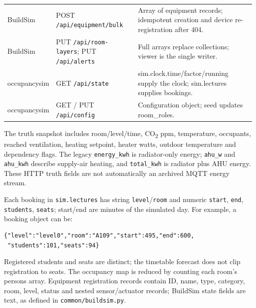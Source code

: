 \documentclass[11pt,a4paper]{article}
\begin{document}
{\begin{longtable}{p{27mm}p{63mm}p{54mm}}
BuildSim & POST \texttt{/api/equipment/bulk} & Array of equipment records; idempotent creation and device re-registration after 404.\\
BuildSim & PUT \texttt{/api/room-layers}; PUT \texttt{/api/alerts} & Full arrays replace collections; viewer is the single writer.\\
occupancysim & GET \texttt{/api/state} & sim.clock.time/factor/running supply the clock; sim.lectures supplies bookings.\\
occupancysim & GET / PUT \texttt{/api/config} & Configuration object; seed updates room\_roles.\\\bottomrule
\end{longtable}}
The truth snapshot includes room/level/time, CO\textsubscript{2} ppm, temperature, occupants, reached ventilation, heating setpoint, heater watts, outdoor temperature and dependency flags. The legacy \texttt{energy\_kwh} is radiator-only energy; \texttt{ahu\_w} and \texttt{ahu\_kwh} describe supply-air heating, and \texttt{total\_kwh} is radiator plus AHU energy. These HTTP truth fields are not automatically an archived MQTT energy stream.

Each booking in \texttt{sim.lectures} has string \texttt{level}/\texttt{room} and numeric \texttt{start}, \texttt{end}, \texttt{students}, \texttt{seats}; start/end are minutes of the simulated day. For example, a booking object can be:
{\small\begin{verbatim}
{"level":"level0","room":"A109","start":495,"end":600,
 "students":101,"seats":94}
\end{verbatim}}
Registered students and seats are distinct; the timetable forecast does not clip registration to seats. The occupancy map is reduced by counting each room's persons array. Equipment registration records contain ID, name, type, category, room, level, status and nested sensor/actuator records; BuildSim state fields are text, as defined in \texttt{common/buildsim.py}.
\end{document}

